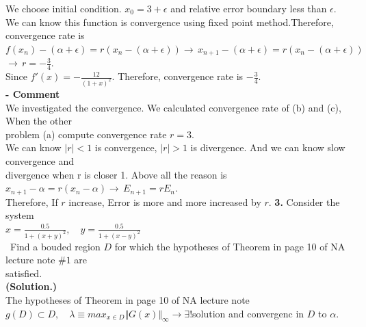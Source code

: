 \documentclass[10pt]{article}
\begin{document}
\begin{flushleft}
\begin{figure}[!h]
	\end{figure}
	\qquad \quad We choose initial condition. $x_0=3+\epsilon$ and relative error boundary less than $\epsilon$.\\
	\qquad \quad We can know this function is convergence using fixed point method.Therefore, convergence rate is\\
	\;\;\;
	\qquad \qquad \qquad \qquad\quad$f(x_n)-(\alpha+\epsilon)=r(x_n-(\alpha+\epsilon)) \rightarrow \, x_{n+1}-(\alpha+\epsilon)=r(x_n-(\alpha+\epsilon))$\\
	\qquad\qquad\qquad\qquad\qquad\qquad\qquad\qquad\qquad\qquad\qquad\qquad$\rightarrow \, r=-\frac{3}{4}$.\\
	\;\;\;
	\qquad \quad Since $f'(x)=-\frac{12}{(1+x)^2}$. Therefore, convergence rate is $-\frac{3}{4}$.\\
	\;\;\;\;
	\qquad \quad \textbf{- Comment}\\
	\qquad \qquad We investigated the convergence. We calculated convergence rate of (b) and (c), When the other\\
	\qquad \qquad problem (a) compute convergence rate $r=3$.\\
	\qquad \qquad We can know $\vert r \vert <1$ is convergence, $\vert r \vert >1$ is divergence. And we can know slow convergence and\\
	\qquad \qquad divergence when r is closer 1. Above all the reason is \\
	\qquad \qquad \qquad \qquad\qquad\qquad\qquad\qquad$x_{n+1}-\alpha=r(x_n-\alpha) \rightarrow \, E_{n+1}=rE_n$.\\
	\qquad \qquad Therefore, If $r$ increase, Error is more and more increased by $r$.
	\newpage
	\textbf{3.} Consider the system\\
	\;\;\;
	\qquad \qquad \qquad \qquad\qquad\qquad\qquad\qquad\qquad $x=\frac{0.5}{1+(x+y)^2},\quad y=\frac{0.5}{1+(x-y)^2}$\\
	\;\;\;
	\quad\, Find a bouded region $D$ for which the hypotheses of Theorem in page 10 of NA lecture note $\#1$ are \\
	\quad\: satisfied.\\
	\;\;\;
	\quad\: \textbf{(Solution.)} \\
	\quad\: The hypotheses of Theorem in page 10 of NA lecture note\\
	\;\;\;
	\qquad\qquad\qquad\qquad $g(D)\subset D,\quad \lambda \equiv max_{x \in D} \Vert G(x) \Vert_{\infty} \rightarrow \exists !$solution and convergenc in $D$ to $\alpha$.\\
	\;\;\;

\end{flushleft}
\end{document}
